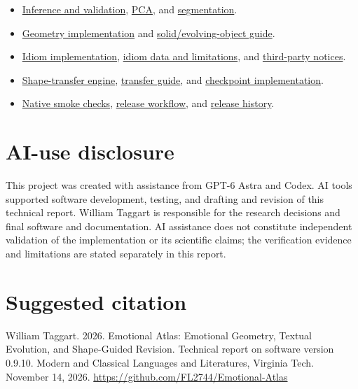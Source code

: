 \documentclass[manuscript,screen,nonacm]{acmart}
\providecommand{\tightlist}{\setlength{\itemsep}{0pt}\setlength{\parskip}{0pt}}
\begin{document}
\begin{itemize}
\tightlist
\item
  \href{https://github.com/FL2744/Emotional-Atlas/blob/main/analysis.py}{Inference
  and validation},
  \href{https://github.com/FL2744/Emotional-Atlas/blob/main/pca.py}{PCA},
  and
  \href{https://github.com/FL2744/Emotional-Atlas/blob/main/segmentation.py}{segmentation}.
\item
  \href{https://github.com/FL2744/Emotional-Atlas/blob/main/geometry.py}{Geometry
  implementation} and
  \href{https://github.com/FL2744/Emotional-Atlas/blob/main/docs/objects.md}{solid/evolving-object
  guide}.
\item
  \href{https://github.com/FL2744/Emotional-Atlas/blob/main/idioms.py}{Idiom
  implementation},
  \href{https://github.com/FL2744/Emotional-Atlas/blob/main/docs/idioms.md}{idiom
  data and limitations}, and
  \href{https://github.com/FL2744/Emotional-Atlas/blob/main/THIRD_PARTY_NOTICES.md}{third-party
  notices}.
\item
  \href{https://github.com/FL2744/Emotional-Atlas/blob/main/shape_transfer.py}{Shape-transfer
  engine},
  \href{https://github.com/FL2744/Emotional-Atlas/blob/main/docs/shape-transfer.md}{transfer
  guide}, and
  \href{https://github.com/FL2744/Emotional-Atlas/blob/main/transfer_session.py}{checkpoint
  implementation}.
\item
  \href{https://github.com/FL2744/Emotional-Atlas/blob/main/smoke.py}{Native
  smoke checks},
  \href{https://github.com/FL2744/Emotional-Atlas/blob/main/scripts/release_notarized.sh}{release
  workflow}, and
  \href{https://github.com/FL2744/Emotional-Atlas/blob/main/CHANGELOG.md}{release
  history}.
\end{itemize}

\section*{AI-use disclosure}
This project was created with assistance from GPT-6 Astra and Codex. AI
tools supported software development, testing, and drafting and revision
of this technical report. William Taggart is responsible for the
research decisions and final software and documentation. AI assistance
does not constitute independent validation of the implementation or its
scientific claims; the verification evidence and limitations are stated
separately in this report.





\section*{Suggested citation}
William Taggart. 2026. Emotional Atlas: Emotional Geometry, Textual
Evolution, and Shape-Guided Revision. Technical report on software
version 0.9.10. Modern and Classical Languages and Literatures, Virginia
Tech. November 14, 2026.
\url{https://github.com/FL2744/Emotional-Atlas}
\end{document}
